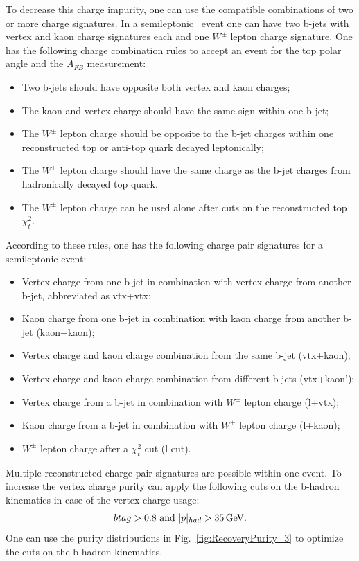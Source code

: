 To decrease this charge impurity, one can use the compatible combinations of two or more charge signatures.
In a semileptonic \ttbar\ event one can have two b-jets with vertex and kaon charge signatures each and one $W^\pm$ lepton charge signature. 
One has the following charge combination rules to accept an event for the top polar angle and the $A_{FB}$ measurement:
\begin{itemize}
	\item Two b-jets should have opposite both vertex and kaon charges;
	\item The kaon and vertex charge should have the same sign within one b-jet;
	\item The $W^\pm$ lepton charge should be opposite to the b-jet charges within one reconstructed top or anti-top quark decayed leptonically; 
	\item The  $W^\pm$ lepton charge should have the same charge as the b-jet charges from hadronically decayed top quark.
	\item The $W^\pm$ lepton charge can be used alone after cuts on the reconstructed top $\chi^2_{t}$.
\end{itemize}

According to these rules, one has the following charge pair signatures for a semileptonic \ttbar event:
\begin{itemize}
	\item Vertex charge from one b-jet in combination with vertex charge from another b-jet, abbreviated as {\sc vtx+vtx};
	\item Kaon charge from one b-jet in combination with kaon charge from another b-jet ({\sc kaon+kaon});
	\item Vertex charge and kaon charge combination from the same b-jet ({\sc vtx+kaon});
	\item Vertex charge and kaon charge combination from different b-jets ({\sc vtx+kaon'});
	\item  Vertex charge from a b-jet  in combination with $W^\pm$ lepton charge ({\sc l+vtx});
	\item  Kaon charge from a b-jet in combination with $W^\pm$ lepton charge ({\sc l+kaon});
	\item $W^\pm$ lepton charge after a $\chi^2_{t}$ cut  ({\sc l }cut).
\end{itemize}
Multiple reconstructed charge pair signatures are possible within one event.
To increase the vertex charge purity can apply the following cuts on the b-hadron kinematics in case of the vertex charge usage:
\begin{equation}
	btag > 0.8\text{ and } |p|_{had} > 35\text{\,GeV}.
\end{equation}
One can use the purity distributions in Fig.~\ref{fig:RecoveryPurity_3} to optimize the cuts on the b-hadron kinematics. 

